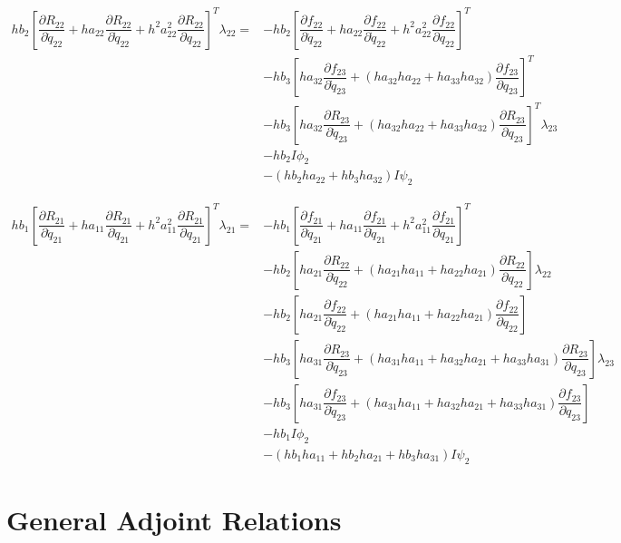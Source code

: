 \documentclass[10pt,letter]{book}
\newcommand{\pd}[2]{\dfrac{\partial #1}{\partial #2}}
\begin{document}
     \begin{equation}
       \begin{split}
         hb_2\left[\pd{R_{22}}{\ddot{q}_{22}} + ha_{22}\pd{R_{22}}{\dot{q}_{22}} + h^2a_{22}^2 \pd{R_{22}}{{q}_{22}} \right]^T \lambda_{22} = & - hb_2 \left[\pd{f_{22}}{\ddot{q}_{22}} + ha_{22}\pd{f_{22}}{\dot{q}_{22}} + h^2a_{22}^2 \pd{f_{22}}{{q}_{22}} \right]^T \\ 
         & - hb_3 \left[ha_{32}\pd{f_{23}}{\dot{q}_{23}} + (ha_{32}ha_{22} + ha_{33}ha_{32}) \pd{f_{23}}{{q}_{23}} \right]^T \\  
         & - hb_3 \left[ha_{32}\pd{R_{23}}{\dot{q}_{23}} + (ha_{32}ha_{22} + ha_{33}ha_{32}) \pd{R_{23}}{{q}_{23}} \right]^T\lambda_{23} \\  
         & - hb_2 I \phi_2 \\ 
         & - (hb_2ha_{22} + hb_3 ha_{32}) I  \psi_2
       \end{split}
     \end{equation}

     \begin{equation}
       \begin{split}
         hb_1\left[\pd{R_{21}}{\ddot{q}_{21}} + ha_{11}\pd{R_{21}}{\dot{q}_{21}} + h^2a_{11}^2 \pd{R_{21}}{{q}_{21}} \right]^T \lambda_{21} = & - hb_1 \left[\pd{f_{21}}{\ddot{q}_{21}} + ha_{11}\pd{f_{21}}{\dot{q}_{21}} + h^2a_{11}^2 \pd{f_{21}}{{q}_{21}} \right]^T \\ 
         & - hb_2 \left[ ha_{21} \pd{R_{22}}{\dot{q}_{22}} + (ha_{21}ha_{11} + ha_{22}ha_{21}) \pd{R_{22}}{{q}_{22}} \right]\lambda_{22} \\
         & - hb_2 \left[ ha_{21} \pd{f_{22}}{\dot{q}_{22}} + (ha_{21}ha_{11} + ha_{22}ha_{21}) \pd{f_{22}}{{q}_{22}} \right] \\
         & - hb_3 \left[ ha_{31} \pd{R_{23}}{\dot{q}_{23}} + (ha_{31}ha_{11} + ha_{32}ha_{21} + ha_{33}ha_{31}) \pd{R_{23}}{{q}_{23}} \right] \lambda_{23} \\
         & - hb_3 \left[ ha_{31} \pd{f_{23}}{\dot{q}_{23}} + (ha_{31}ha_{11} + ha_{32}ha_{21} + ha_{33}ha_{31}) \pd{f_{23}}{{q}_{23}} \right] \\
         & - hb_1I \phi_2 \\ 
         & - (hb_1ha_{11} + hb_2ha_{21}+ hb_3ha_{31}) I \psi_2
       \end{split}
     \end{equation}


     \section{General Adjoint Relations}
\end{document}
